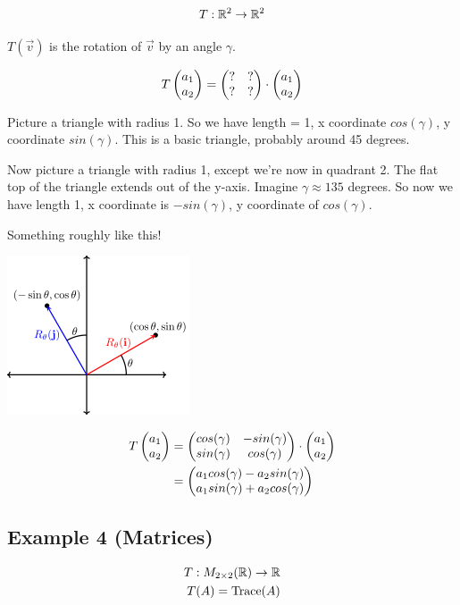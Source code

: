 \documentclass[a4paper]{article}
\begin{document}
\[
T: \R^2 \to \R^2
\]

$T(\vec{v})$ is the rotation of $\vec{v}$ by an angle $\gamma$.

\[
	\begin{aligned}
		T\genericmat{p}{a_1\\a_2} = \genericmat{p}{? & ? \\ ? & ?} \cdot \genericmat{p}{a_1\\a_2}
	\end{aligned}
\]

Picture a triangle with radius 1. So we have length = 1, x coordinate $cos(\gamma)$, y coordinate $sin(\gamma)$. This is a basic triangle, probably around 45 degrees.

Now picture a triangle with radius 1, except we're now in quadrant 2. The flat top of the triangle extends out of the y-axis. Imagine $\gamma \approx 135$ degrees. So now we have length 1, x coordinate is $-sin(\gamma)$, y coordinate of $cos(\gamma)$. 

Something roughly like this! 

\includegraphics[scale=0.75]{fig1}

\[
	\begin{aligned}
		T\genericmat{p}{a_1\\a_2} &= \genericmat{p}{cos(\gamma) & -sin(\gamma)\\sin(\gamma) & cos(\gamma)} \cdot \genericmat{p}{a_1\\a_2}
		\\
		&= \genericmat{p}{a_1 cos(\gamma) - a_2 sin(\gamma) \\ a_1 sin(\gamma) + a_2 cos(\gamma)}
	\end{aligned}
\]

\subsection{Example 4 (Matrices)}

\[
	\begin{aligned}
		T: M_{2 \times 2}(\R) \to \R \\
		T(A) = \text{Trace}(A)
	\end{aligned}
\]
\end{document}
